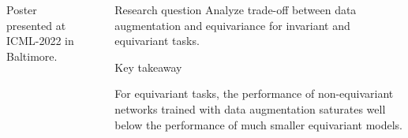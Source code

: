 \documentclass[
                20pt,
                final,
                hyperref={%
                    breaklinks=true,%
                    letterpaper=true,%
                    colorlinks,%
                    bookmarks=false%
                }]{beamer}
\newlength{\sepwid}
\newlength{\onecolwid}
\newlength{\twocolwid}
\newlength{\midwid}
\begin{document}
\begin{frame}[t]
\begin{columns}[t]
\begin{column}{\onecolwid}
                \vfill
                \noindent\footnotesize{Poster presented at ICML-2022 in Baltimore.}
            \end{column}

            \begin{column}{\sepwid}
            \end{column}


            \begin{column}{\twocolwid}
                \vspace{-.6in}


                \begin{alertblock}{\huge{Research question}}
                    \centering\LARGE
                    Analyze trade-off between data augmentation and equivariance for invariant and equivariant tasks.
                \end{alertblock}
                \medskip
                \begin{alertblock}{\huge{Key takeaway}}
                    \centering
                    \setlength{\columnsep}{60pt}
                    \begin{multicols}{2}
                        For equivariant tasks, the performance of non-equivariant networks trained with data augmentation saturates well below the performance of much smaller equivariant models.


\end{multicols}
\end{alertblock}
\end{column}
\end{columns}
\end{frame}
\end{document}
